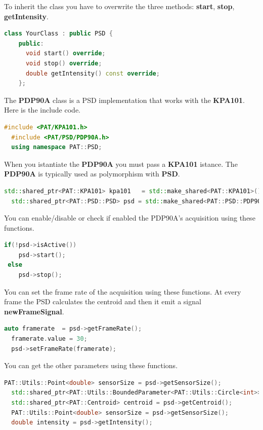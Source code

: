 To inherit the class you have to overwrite the three methods:
\textbf{start}, \textbf{stop}, \textbf{getIntensity}.

\begin{lstlisting}[language=c++, gobble=2]
  class YourClass : public PSD {
    public:
      void start() override;
      void stop() override;
      double getIntensity() const override;
    };    
\end{lstlisting}


The \textbf{PDP90A} class is a PSD implementation that works with the
\textbf{KPA101}. Here is the include code.

\begin{lstlisting}[language=c++, gobble=2]
  #include <PAT/KPA101.h>
  #include <PAT/PSD/PDP90A.h>
  using namespace PAT::PSD;  
\end{lstlisting}

When you istantiate the \textbf{PDP90A} you must pass a \textbf{KPA101}
istance. The \textbf{PDP90A} is typically used as polymorphism with
\textbf{PSD}.

\begin{lstlisting}[language=c++, gobble=2]
  std::shared_ptr<PAT::KPA101> kpa101   = std::make_shared<PAT::KPA101>();
  std::shared_ptr<PAT::PSD::PSD> psd = std::make_shared<PAT::PSD::PDP90A>(kpa101);
\end{lstlisting}

You can enable/disable or check if enabled the PDP90A's acquisition
using these functions.

\begin{lstlisting}[language=c++, gobble=2]
  if(!psd->isActive())
    psd->start();
 else
    psd->stop();
\end{lstlisting}

You can set the frame rate of the acquisition using these functions. At
every frame the PSD calculates the centroid and then it emit a signal
\textbf{newFrameSignal}.

\begin{lstlisting}[language=c++, gobble=2]
  auto framerate  = psd->getFrameRate();
  framerate.value = 30;
  psd->setFrameRate(framerate);
\end{lstlisting}

You can get the other parameters using these functions.

\begin{lstlisting}[language=c++, gobble=2]
  PAT::Utils::Point<double> sensorSize = psd->getSensorSize();
  std::shared_ptr<PAT::Utils::BoundedParameter<PAT::Utils::Circle<int>>> target = psd->getTarget();
  std::shared_ptr<PAT::Centroid> centroid = psd->getCentroid();
  PAT::Utils::Point<double> sensorSize = psd->getSensorSize();
  double intensity = psd->getIntensity();
\end{lstlisting}

